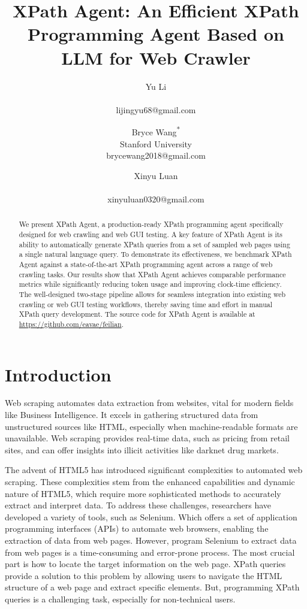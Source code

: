 \documentclass[a4paper]{article}
\title{XPath Agent: An Efficient XPath Programming Agent Based on LLM for Web Crawler}
\author{
Yu Li \\ \\ lijingyu68@gmail.com
\and
Bryce Wang\textsuperscript{*} \\ Stanford University  \\ brycewang2018@gmail.com
\and
Xinyu Luan \\ \\ xinyuluan0320@gmail.com
}
\begin{document}
\maketitle

\begin{abstract}
  We present XPath Agent, a production-ready XPath programming agent specifically designed for web crawling and web GUI testing. A key feature of XPath Agent is its ability to automatically generate XPath queries from a set of sampled web pages using a single natural language query. To demonstrate its effectiveness, we benchmark XPath Agent against a state-of-the-art XPath programming agent across a range of web crawling tasks. Our results show that XPath Agent achieves comparable performance metrics while significantly reducing token usage and improving clock-time efficiency. The well-designed two-stage pipeline allows for seamless integration into existing web crawling or web GUI testing workflows, thereby saving time and effort in manual XPath query development. The source code for XPath Agent is available at \url{https://github.com/eavae/feilian}.
\end{abstract}

\section{Introduction}

Web scraping\cite{khder2021web} automates data extraction from websites, vital for modern fields like Business Intelligence. It excels in gathering structured data from unstructured sources like HTML, especially when machine-readable formats are unavailable. Web scraping provides real-time data, such as pricing from retail sites, and can offer insights into illicit activities like darknet drug markets.

The advent of HTML5\cite{TABARES2021101529} has introduced significant complexities to automated web scraping. These complexities stem from the enhanced capabilities and dynamic nature of HTML5, which require more sophisticated methods to accurately extract and interpret data. To address these challenges, researchers have developed a variety of tools, such as Selenium\cite{selenium}. Which offers a set of application programming interfaces (APIs) to automate web browsers, enabling the extraction of data from web pages. However, program Selenium to extract data from web pages is a time-consuming and error-prone process. The most crucial part is how to locate the target information on the web page. XPath queries provide a solution to this problem by allowing users to navigate the HTML structure of a web page and extract specific elements. But, programming XPath queries is a challenging task, especially for non-technical users.
\end{document}
